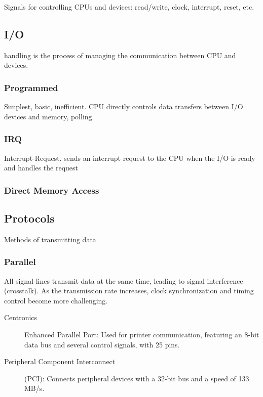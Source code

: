 \documentclass[11pt,journal,compsoc]{IEEEtran}
\begin{document}
Signals for controlling CPUs and devices: read/write, clock, interrupt, reset, etc.


\subsection{I/O}

handling is the process of managing the communication between CPU and devices.


\subsubsection{Programmed}

Simplest, basic, inefficient. CPU directly controls data transfers between I/O devices and memory, polling.


\subsubsection{IRQ}

Interrupt-Request. sends an interrupt request to the CPU when the I/O is ready and handles the request


\subsubsection{Direct Memory Access}


\subsection{Protocols}

Methods of transmitting data


\subsubsection{Parallel}

All signal lines transmit data at the same time, leading to signal interference (crosstalk). As the transmission rate increases, clock synchronization and timing control become more challenging.

\begin{description}
    \item[Centronics] Enhanced Parallel Port: Used for printer communication, featuring an 8-bit data bus and several control signals, with 25 pins.
    
    \item[Peripheral Component Interconnect] (PCI): Connects peripheral devices with a 32-bit bus and a speed of 133 MB/s.
\end{description}
\end{document}
